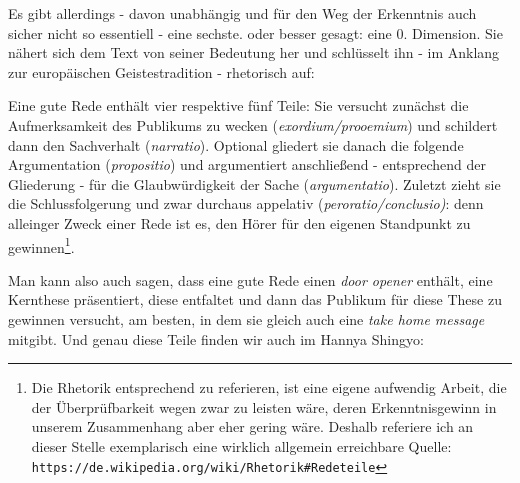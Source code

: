 \documentclass[
DIV=calc,
BCOR=5mm,
11pt,
headings=small,
oneside,
bibtotocnumbered,
english,ngerman]{scrartcl}
\begin{document}
Es gibt allerdings - davon unabhängig und für den Weg der Erkenntnis auch sicher
nicht so essentiell - eine sechste. oder besser gesagt: eine 0. Dimension. Sie
nähert sich dem Text von seiner Bedeutung her  und schlüsselt ihn - im Anklang
zur europäischen Geistestradition - rhetorisch auf:

Eine gute Rede enthält vier respektive fünf Teile: Sie versucht zunächst die
Aufmerksamkeit des Publikums zu wecken (\emph{exordium/prooemium}) und schildert
dann den Sachverhalt (\emph{narratio}). Optional gliedert sie danach die
folgende Argumentation (\emph{propositio}) und argumentiert anschließend -
entsprechend der Gliederung - für die Glaubwürdigkeit der Sache
(\emph{argumentatio}). Zuletzt zieht sie die Schlussfolgerung und zwar durchaus
appelativ (\emph{peroratio/conclusio)}: denn alleinger Zweck einer Rede ist es,
den Hörer für den eigenen Standpunkt zu gewinnen\footnote{Die Rhetorik
entsprechend zu referieren, ist eine eigene aufwendig Arbeit, die der
Überprüfbarkeit wegen zwar zu leisten wäre, deren Erkenntnisgewinn in unserem
Zusammenhang aber eher gering wäre. Deshalb referiere ich an dieser Stelle
exemplarisch eine wirklich allgemein erreichbare Quelle:
\texttt{https://de.wikipedia.org/wiki/Rhetorik\#Redeteile} }.

Man kann also auch sagen, dass eine gute Rede einen \emph{door opener} enthält,
eine Kernthese präsentiert, diese entfaltet und dann das Publikum für diese
These zu gewinnen versucht, am besten, in dem sie gleich auch eine \emph{take
home message} mitgibt. Und genau diese Teile finden wir auch im Hannya Shingyo:



\end{document}
